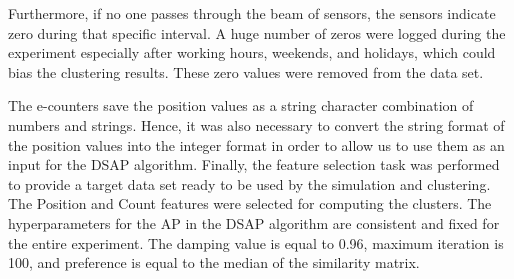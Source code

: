 Furthermore, if no one passes through the beam of sensors, the sensors indicate zero during that specific interval. A huge number of zeros were logged during the experiment especially after working hours, weekends, and holidays, which could bias the clustering results. These zero values were removed from the data set. 

The e-counters save the position values as a string character combination of numbers and strings. Hence, it was also necessary to convert the string format of the position values into the integer format in order to allow us to use them as an input for the DSAP algorithm. 
Finally, the feature selection task was performed to provide a target data set ready to be used by the simulation and clustering. The Position and Count features were selected for computing the clusters. The hyperparameters for the AP in the DSAP algorithm are consistent and fixed for the entire experiment. The damping value is equal to 0.96, maximum iteration is 100, and preference is equal to the median of the similarity matrix.









